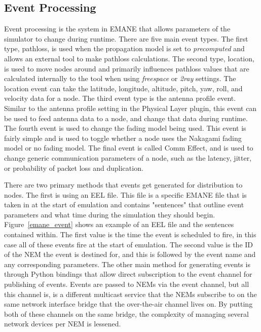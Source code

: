 \subsection{Event Processing}
Event processing is the system in EMANE that allows parameters of the simulator to change during runtime.
There are five main event types.
The first type, pathloss, is used when the propagation model is set to \textit{precomputed} and allows an external tool to make pathloss calculations.
The second type, location, is used to move nodes around and primarily influences pathloss values that are calculated internally to the tool when using \textit{freespace} or \textit{2ray} settings.
The location event can take the latitude, longitude, altitude, pitch, yaw, roll, and velocity data for a node.
The third event type is the antenna profile event.
Similar to the antenna profile setting in the Physical Layer plugin, this event can be used to feed antenna data to a node, and change that data during runtime.
The fourth event is used to change the fading model being used.
This event is fairly simple and is used to toggle whether a node uses the Nakagami fading model or no fading model.
The final event is called Comm Effect, and is used to change generic communication parameters of a node, such as the latency, jitter, or probability of packet loss and duplication. \par
There are two primary methods that events get generated for distribution to nodes.
The first is using an EEL file.
This file is a specific EMANE file that is taken in at the start of emulation and contains "sentences" that outline event parameters and what time during the simulation they should begin.
Figure~\ref{emane_event} shows an example of an EEL file and the sentences contained within.
The first value is the time the event is scheduled to fire, in this case all of these events fire at the start of emulation.
The second value is the ID of the NEM the event is destined for, and this is followed by the event name and any corresponding parameters.
The other main method for generating events is through Python bindings that allow direct subscription to the event channel for publishing of events.
Events are passed to NEMs via the event channel, but all this channel is, is a different multicast service that the NEMs subscribe to on the same network interface bridge that the over-the-air channel lives on.
By putting both of these channels on the same bridge, the complexity of managing several network devices per NEM is lessened.

